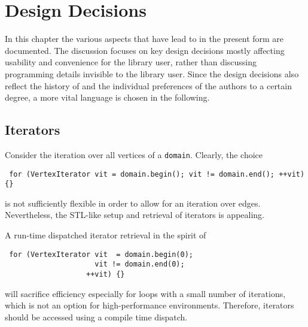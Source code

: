 \chapter{Design Decisions} \label{chap:design}

 

In this chapter the various aspects that have lead to {\ViennaGrid} in the present form are documented.
The discussion focuses on key design decisions mostly affecting usability and convenience for the library user,
rather than discussing programming details invisible to the library user. Since the design decisions also reflect
the history of {\ViennaGrid} and the individual preferences of the authors to a certain degree, a more vital language is chosen in the following.

 \section{Iterators}
 Consider the iteration over all vertices of a \lstinline|domain|. Clearly, the choice
 \begin{lstlisting}
 for (VertexIterator vit = domain.begin(); vit != domain.end(); ++vit) {}
 \end{lstlisting}
 is not sufficiently flexible in order to allow for an iteration over edges.
 Nevertheless, the STL-like setup and retrieval of iterators is appealing.

 A run-time dispatched iterator retrieval in the spirit of 
 \begin{lstlisting}
 for (VertexIterator vit  = domain.begin(0);
                     vit != domain.end(0);
                   ++vit) {}
 \end{lstlisting}
 will sacrifice efficiency especially for loops with a small number of iterations, which is not an option for high-performance environments. 
 Therefore, iterators should be accessed using a compile time dispatch.

